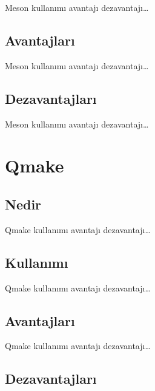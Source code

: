 \documentclass[
]{book}
\begin{document}
Meson kullanımı avantajı dezavantajı\ldots{}

\hypertarget{avantajlarux131-4}{%
\section*{Avantajları}\label{avantajlarux131-4}}

Meson kullanımı avantajı dezavantajı\ldots{}

\hypertarget{dezavantajlarux131-4}{%
\section*{Dezavantajları}\label{dezavantajlarux131-4}}

Meson kullanımı avantajı dezavantajı\ldots{}

\hypertarget{qmake}{%
\chapter*{Qmake}\label{qmake}}

\hypertarget{nedir-5}{%
\section*{Nedir}\label{nedir-5}}

Qmake kullanımı avantajı dezavantajı\ldots{}

\hypertarget{kullanux131mux131-5}{%
\section*{Kullanımı}\label{kullanux131mux131-5}}

Qmake kullanımı avantajı dezavantajı\ldots{}

\hypertarget{avantajlarux131-5}{%
\section*{Avantajları}\label{avantajlarux131-5}}

Qmake kullanımı avantajı dezavantajı\ldots{}

\hypertarget{dezavantajlarux131-5}{%
\section*{Dezavantajları}\label{dezavantajlarux131-5}}
\end{document}
